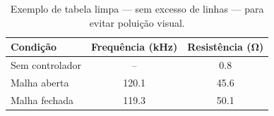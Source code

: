 \documentclass[a4paper,11pt]{article}
\begin{document}
\begin{table}[hbpt]
\centering
\caption{Exemplo de tabela limpa --- sem excesso de linhas --- para evitar poluição visual.}
\label{tab:exemplo}
\begin{tabular}{lcc}
\toprule
Condição & Frequência (\si{kHz}) & Resistência (\si{\ohm}) \\
\midrule
Sem controlador & -- & \num{0.8} \\
Malha aberta & \num{120.1} & \num{45.6} \\
Malha fechada & \num{119.3} & \num{50.1} \\
\bottomrule
\end{tabular}
\end{table}




\end{document}
